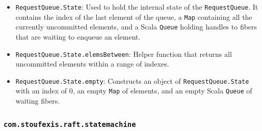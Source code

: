 \begin{itemize}
    \item \lstinline|RequestQueue.State|: Used to hold the internal state of the \lstinline|RequestQueue|. It contains the index of the last element of the queue, a \lstinline|Map| containing all the currently uncommitted elements, and a Scala \lstinline|Queue| holding handles to fibers that are waiting to enqueue an element.
    \item \lstinline|RequestQueue.State.elemsBetween|: Helper function that returns all uncommitted elements within a range of indexes.
    \item \lstinline|RequestQueue.State.empty|: Constructs an object of \lstinline|RequestQueue.State| with an index of 0, an empty \lstinline|Map| of elements, and an empty Scala \lstinline|Queue| of waiting fibers.
\end{itemize}

\subsubsection{\lstinline|com.stoufexis.raft.statemachine|}

